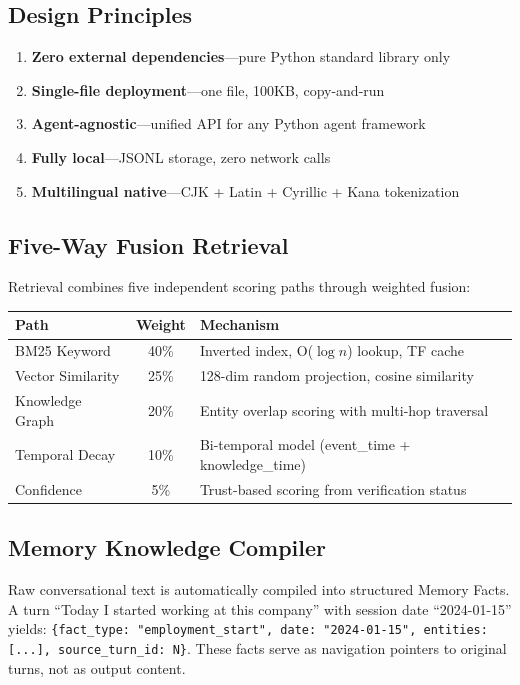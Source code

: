 \documentclass[11pt,a4paper]{article}
\begin{document}
\subsection{Design Principles}

\begin{enumerate}
    \item \textbf{Zero external dependencies}---pure Python standard library only
    \item \textbf{Single-file deployment}---one file, 100KB, copy-and-run
    \item \textbf{Agent-agnostic}---unified API for any Python agent framework
    \item \textbf{Fully local}---JSONL storage, zero network calls
    \item \textbf{Multilingual native}---CJK + Latin + Cyrillic + Kana tokenization
\end{enumerate}

\subsection{Five-Way Fusion Retrieval}

Retrieval combines five independent scoring paths through weighted fusion:

\begin{table}[h]
\centering
\begin{tabular}{lcl}
\toprule
\textbf{Path} & \textbf{Weight} & \textbf{Mechanism} \\
\midrule
BM25 Keyword & 40\% & Inverted index, O($\log n$) lookup, TF cache \\
Vector Similarity & 25\% & 128-dim random projection, cosine similarity \\
Knowledge Graph & 20\% & Entity overlap scoring with multi-hop traversal \\
Temporal Decay & 10\% & Bi-temporal model (event\_time + knowledge\_time) \\
Confidence & 5\% & Trust-based scoring from verification status \\
\bottomrule
\end{tabular}
\end{table}

\subsection{Memory Knowledge Compiler}

Raw conversational text is automatically compiled into structured Memory Facts. A turn ``Today I started working at this company'' with session date ``2024-01-15'' yields: \texttt{\{fact\_type: "employment\_start", date: "2024-01-15", entities: [...], source\_turn\_id: N\}}. These facts serve as navigation pointers to original turns, not as output content.
\end{document}
